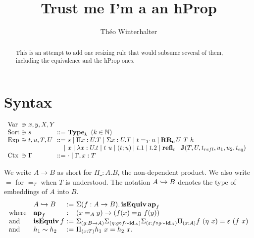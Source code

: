 \documentclass[a4paper,english]{lipics-utf8x}
\title{Trust me I'm a an hProp}
\author[1]{Théo Winterhalter}
\begin{document}
  \maketitle

  \begin{abstract}
    This is an attempt to add one resizing rule that would subsume several of
    them, including the equivalence and the hProp ones.
  \end{abstract}

  \section{Syntax}

  \[
    \begin{array}{l@{~}l@{~}l@{~}r@{~}l@{\quad}l}
      \Var  & \ni & x,y,X,Y \\
      \Sort & \ni & s             & ::= & \Type_k \mbox{ }
                                                (k \in \mathbb{N}) \\
      \Exp  & \ni & t,u,T,U & ::= & s \mid \Pi x:U.T \mid \Sigma x:U.T \mid
                                    t =_T u \mid \RRe{U}{T}{h} \\
                         &&& \mid & x \mid \lambda x:U.t \mid t~u
                               \mid (t;u) \mid t.1 \mid t.2 \mid \refl_t \mid
                               \J (T,U,t_{refl},u_1,u_2,t_{eq}) \\
      \Ctx  & \ni & \Gamma  & ::= & \cdot \mid \Gamma, x:T \\
    \end{array}
  \]

  \noindent %
  We write $A \to B$ as short for $\Pi \_:A.B$, the non-dependent product.
  We also write $=$ for $=_T$ when $T$ is understood.
  The notation $A \hookrightarrow B$ denotes the type of embeddings of $A$ into $B$.
  \[
    \begin{array}{l@{\quad}l@{~}l@{~}l}
      & \emb{A}{B} &:=& \Sigma (f : A \to B). \isEquiv \ap_f \\
      \text{where} & \ap_f &:& (x =_A y) \to (f(x) =_B f(y)) \\
      \text{and} & \isEquiv f &:=& \Sigma_{(g : B \to A)}
                               \Sigma_{(\eta : g \circ f \sim \id_A)}
                               \Sigma_{(\varepsilon : f \circ g \sim \id_B)}
                               \Pi_{(x : A)} f~(\eta~x) = \varepsilon~(f~x) \\
      \text{and} & h_1 \sim h_2 &:=& \Pi_{(x : T)} h_1~x = h_2~x.
    \end{array}
  \]
\end{document}
